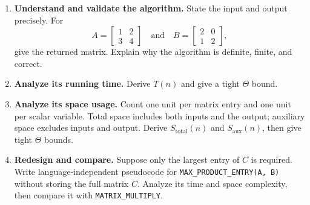 \documentclass[11pt,a4paper]{article}
\begin{document}
\begin{enumerate}[label=\textbf{Part \arabic*.},leftmargin=4.6em]
    \item \textbf{Understand and validate the algorithm.}
    State the input and output precisely. For
    \[
      A=\begin{bmatrix}1&2\\3&4\end{bmatrix}
      \quad\text{and}\quad
      B=\begin{bmatrix}2&0\\1&2\end{bmatrix},
    \]
    give the returned matrix. Explain why the algorithm is definite, finite,
    and correct.

    \item \textbf{Analyze its running time.}
    Derive $T(n)$ and give a tight $\Theta$ bound.

    \item \textbf{Analyze its space usage.}
    Count one unit per matrix entry and one unit per scalar variable. Total
    space includes both inputs and the output; auxiliary space excludes inputs
    and output. Derive $S_{\mathrm{total}}(n)$ and
    $S_{\mathrm{aux}}(n)$, then give tight $\Theta$ bounds.

    \item \textbf{Redesign and compare.}
    Suppose only the largest entry of $C$ is required. Write language-independent
    pseudocode for \texttt{MAX\_PRODUCT\_ENTRY(A, B)} without storing the full
    matrix $C$. Analyze its time and space complexity, then compare it with
    \texttt{MATRIX\_MULTIPLY}.
\end{enumerate}
\end{document}
